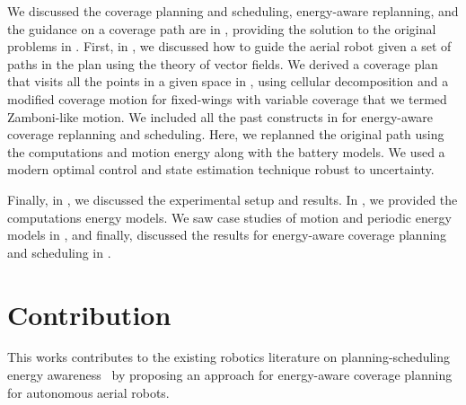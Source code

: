 We discussed the coverage planning and scheduling, energy-aware replanning, and the guidance on a coverage path are in , providing the solution to the original problems in . First, in , we discussed how to guide the aerial robot given a set of paths in the plan using the theory of vector fields. We derived a coverage plan that visits all the points in a given space in , using cellular decomposition and a modified coverage motion for fixed-wings with variable coverage that we termed Zamboni-like motion. We included all the past constructs in  for energy-aware coverage replanning and scheduling. Here, we replanned the original path using the computations and motion energy along with the battery models. We used a modern optimal control and state estimation technique robust to uncertainty. 

Finally, in , we discussed the experimental setup and results. In , we provided the \powprof{} computations energy models. We saw case studies of motion and periodic energy models in , and finally, discussed the results for energy-aware coverage planning and scheduling in .




\section{Contribution}

This works contributes to the existing robotics literature on planning-scheduling energy awareness~\citep{mei2005case,mei2006deployment,brateman2006energy,zhang2007low,sadrpour2013experimental,sadrpour2013mission,ondruska2015scheduled,lahijanian2018resource,sudhakar2020balancing} by proposing an approach for energy-aware coverage planning for autonomous aerial robots.

